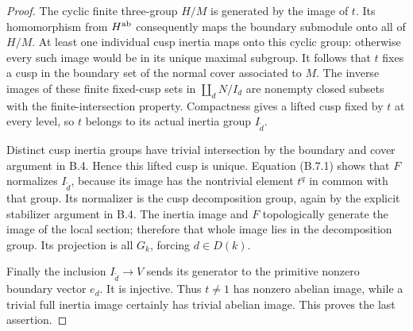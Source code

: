 \begin{proof}
The cyclic finite three-group $H/M$ is generated by the image
of $t$.  Its homomorphism from $H^{\rm ab}$ consequently maps
the boundary submodule onto all of $H/M$.  At least one
individual cusp inertia maps onto this cyclic group: otherwise
every such image would be in its unique maximal subgroup.
It follows that $t$ fixes a cusp in the boundary set of the
normal cover associated to $M$.
The inverse images of these finite fixed-cusp sets in
$\coprod_d N/I_d$ are nonempty closed subsets with the
finite-intersection property.  Compactness gives a lifted
cusp fixed by $t$ at every level, so $t$ belongs to its
actual inertia group $I_{\widetilde d}$.

Distinct cusp inertia groups have trivial intersection by
the boundary and cover argument in B.4.  Hence this lifted
cusp is unique.  Equation (B.7.1) shows that $F$ normalizes
$I_{\widetilde d}$, because its image has the nontrivial
element $t^q$ in common with that group.  Its normalizer is
the cusp decomposition group, again by the explicit
stabilizer argument in B.4.  The inertia image and $F$
topologically generate the image of the local section;
therefore that whole image lies in the decomposition group.
Its projection is all $G_k$, forcing $d\in D(k)$.

Finally the inclusion $I_{\widetilde d}\to V$ sends its
generator to the primitive nonzero boundary vector $e_d$.
It is injective.  Thus $t\ne1$ has nonzero abelian image,
while a trivial full inertia image certainly has trivial
abelian image.  This proves the last assertion.
\end{proof}

